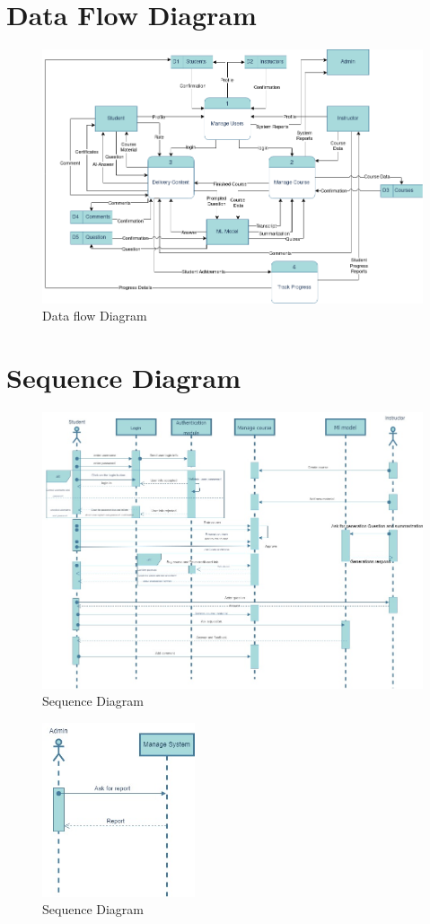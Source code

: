 \section{Data Flow Diagram}
\begin{figure}[h!]
	\centering
	\includegraphics[max height=\textheight,max width=\textwidth]{figures/DFD.png}
	\caption{Data flow Diagram}
\end{figure}

\newpage

\section{Sequence Diagram}
\begin{figure}[h!]
	\centering
	\includegraphics[max height=\textheight,max width=\textwidth]{figures/sequence.jpeg}
	\caption{Sequence Diagram}
\end{figure}

\begin{figure}[h!]
	\centering
	\includegraphics[width=0.40\textwidth]{figures/sequence-admin.jpeg}
	\caption{Sequence Diagram}
\end{figure}